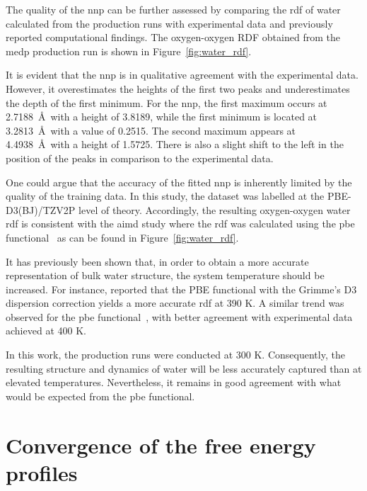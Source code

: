 The quality of the \ac{nnp} can be further assessed by comparing the \ac{rdf} of water calculated from the production runs with experimental data and previously reported computational findings. The oxygen-oxygen RDF obtained from the \ac{medp} production run is shown in Figure~\ref{fig:water_rdf}.

It is evident that the \ac{nnp} is in qualitative agreement with the experimental data. However, it overestimates the heights of the first two peaks and underestimates the depth of the first minimum. For the \ac{nnp}, the first maximum occurs at 2.7188~\AA\ with a height of 3.8189, while the first minimum is located at 3.2813~\AA\ with a value of 0.2515. The second maximum appears at 4.4938~\AA\ with a height of 1.5725. There is also a slight shift to the left in the position of the peaks in comparison to the experimental data.

One could argue that the accuracy of the fitted \ac{nnp} is inherently limited by the quality of the training data. In this study, the dataset was labelled at the PBE-D3(BJ)/TZV2P level of theory. Accordingly, the resulting oxygen-oxygen water \ac{rdf} is consistent with the \ac{aimd} study where the \ac{rdf} was calculated using the \ac{pbe} functional~\citep{phamStructureDynamicsAqueous2016} as can be found in Figure~\ref{fig:water_rdf}.

It has previously been shown that, in order to obtain a more accurate representation of bulk water structure, the system temperature should be increased. For instance, \citep{zhouQuantifyingStructureWater2022} reported that the PBE functional with the Grimme's D3 dispersion correction yields a more accurate \ac{rdf} at 390 K. A similar trend was observed for the \ac{pbe} functional~\citep{phamStructureDynamicsAqueous2016}, with better agreement with experimental data achieved at 400 K.

In this work, the production runs were conducted at 300 K. Consequently, the resulting structure and dynamics of water will be less accurately captured than at elevated temperatures. Nevertheless, it remains in good agreement with what would be expected from the \ac{pbe} functional.



\section{Convergence of the free energy profiles}



